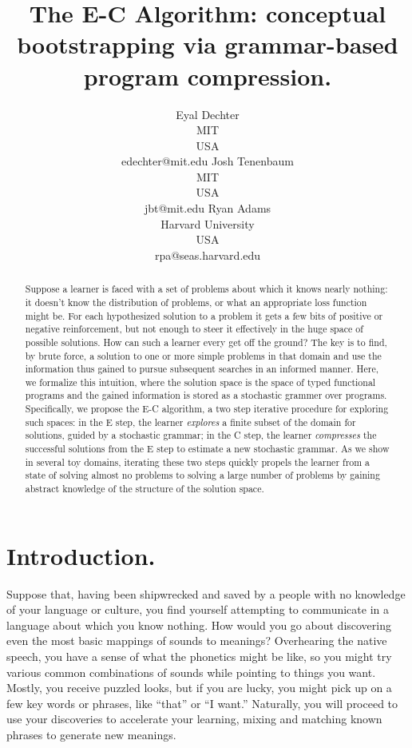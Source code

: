 \documentclass{article}
\title{The E-C Algorithm: conceptual bootstrapping via grammar-based
  program compression.}
\author{Eyal Dechter \\
MIT\\
USA \\
edechter@mit.edu
\And
Josh Tenenbaum \\
MIT\\
USA \\
jbt@mit.edu
\And 
Ryan Adams \\
Harvard University\\
USA \\
rpa@seas.harvard.edu}
\begin{document}
\maketitle

\begin{abstract}
Suppose a learner is faced with a set of problems about which it knows
nearly nothing: it doesn't know the distribution of problems, or what
an appropriate loss function might be. For each hypothesized solution
to a problem it gets a few bits of positive or negative reinforcement,
but not enough to steer it effectively in the huge space of possible
solutions. How can such a learner every get off the ground? The key is
to find, by brute force, a solution to one or more simple problems in
that domain and use the information thus gained to pursue subsequent
searches in an informed manner. Here, we formalize this intuition,
where the solution space is the space of typed functional programs and
the gained information is stored as a stochastic grammer over
programs. Specifically, we propose the E-C algorithm, a two step
iterative procedure for exploring such spaces: in the E step, the
learner \emph{explores} a finite subset of the domain for solutions,
guided by a stochastic grammar; in the C step, the learner
\emph{compresses} the successful solutions from the E step to estimate
a new stochastic grammar. As we show in several toy domains, iterating
these two steps quickly propels the learner from a state of solving
almost no problems to solving a large number of problems by gaining
abstract knowledge of the structure of the solution space.
\end{abstract}

\section{Introduction.}

Suppose that, having been shipwrecked and saved by a people with no
knowledge of your language or culture, you find yourself attempting to
communicate in a language about which you know nothing. How would you
go about discovering even the most basic mappings of sounds to
meanings? Overhearing the native speech, you have a sense of what the
phonetics might be like, so you might try various common combinations
of sounds while pointing to things you want. Mostly, you receive
puzzled looks, but if you are lucky, you might pick up on a few key
words or phrases, like ``that'' or ``I want.'' Naturally, you will
proceed to use your discoveries to accelerate your learning, mixing
and matching known phrases to generate new meanings. 
\end{document}
